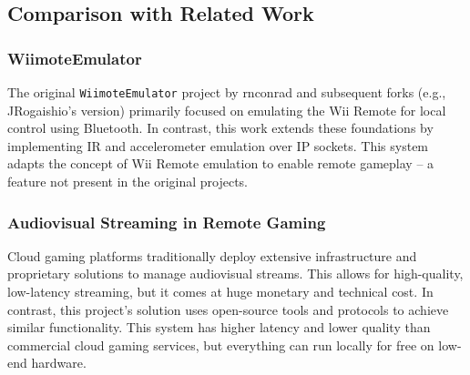

\subsection{Comparison with Related Work}

\subsubsection{WiimoteEmulator}
The original \texttt{WiimoteEmulator} project by rnconrad and subsequent forks
(e.g., JRogaishio's version) primarily focused on emulating the Wii Remote for
local control using Bluetooth. In contrast, this work extends these foundations
by implementing IR and accelerometer emulation over IP sockets. This system adapts the concept of
Wii Remote emulation to enable remote gameplay -- a feature not present in the
original projects.

\subsubsection{Audiovisual Streaming in Remote Gaming}
Cloud gaming platforms traditionally deploy extensive infrastructure and
proprietary solutions to manage audiovisual streams. This allows for
high-quality, low-latency streaming, but it comes at huge monetary and technical
cost\cite{cloudSurvey}.
In contrast, this project's solution uses open-source tools and
protocols to achieve similar functionality. This system has higher latency and lower quality than
commercial cloud gaming services, but everything can run locally for free on low-end hardware.

